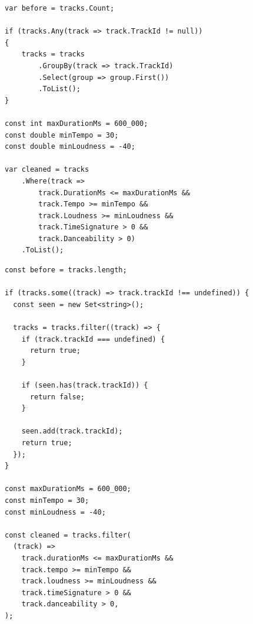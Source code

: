 \documentclass[../main.tex]{subfiles}
\begin{document}
\begin{verbatim}
var before = tracks.Count;

if (tracks.Any(track => track.TrackId != null))
{
    tracks = tracks
        .GroupBy(track => track.TrackId)
        .Select(group => group.First())
        .ToList();
}

const int maxDurationMs = 600_000;
const double minTempo = 30;
const double minLoudness = -40;

var cleaned = tracks
    .Where(track =>
        track.DurationMs <= maxDurationMs &&
        track.Tempo >= minTempo &&
        track.Loudness >= minLoudness &&
        track.TimeSignature > 0 &&
        track.Danceability > 0)
    .ToList();
\end{verbatim}

\begin{verbatim}
const before = tracks.length;

if (tracks.some((track) => track.trackId !== undefined)) {
  const seen = new Set<string>();

  tracks = tracks.filter((track) => {
    if (track.trackId === undefined) {
      return true;
    }

    if (seen.has(track.trackId)) {
      return false;
    }

    seen.add(track.trackId);
    return true;
  });
}

const maxDurationMs = 600_000;
const minTempo = 30;
const minLoudness = -40;

const cleaned = tracks.filter(
  (track) =>
    track.durationMs <= maxDurationMs &&
    track.tempo >= minTempo &&
    track.loudness >= minLoudness &&
    track.timeSignature > 0 &&
    track.danceability > 0,
);
\end{verbatim}
\end{document}
